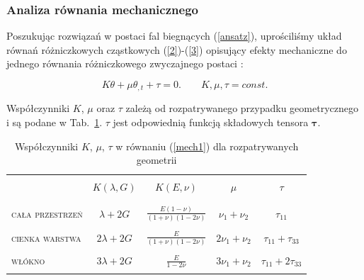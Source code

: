 \medskip 

\subsubsection{Analiza równania mechanicznego} \label{secmech} 

\medskip 

Poszukując rozwiązań w postaci fal biegnących (\ref{ansatz}), uprościliśmy układ równań różniczkowych cząstkowych (\ref{2})-(\ref{3}) opisujący efekty mechaniczne do jednego równania różniczkowego zwyczajnego postaci \cite{Kazmierczak2010,Kazmierczak2013,Kazmierczak2011}: 

\begin{equation} \label{mech1} 
K \theta + \mu \theta_{,t} + {\tau} =0. \qquad K, \mu, \tau  =const.
\end{equation}

\medskip 

\noindent Współczynniki $K$, $\mu$ oraz $\tau$ zależą od rozpatrywanego przypadku geometrycznego i są podane w Tab.~\ref{tab:tensor}. $\tau$ jest odpowiednią funkcją składowych tensora ${\boldsymbol \tau}$. 

\medskip

\begin{table}
	\centering
	\begin{tabular}{@{} | l |c | c | c | c | @{}}
		\hline 
		&&&& \\
		&$K(\lambda,G)$ & $K(E,\nu)$ &$\mu$& $\tau$ \\ 
		&&&& \\ \hline 
		&&&& \\
		\textsc{cała przestrzeń} & $\lambda+2G$ & $\frac{E(1-\nu)}{(1+\nu)(1-2\nu)}$ 
		& $\nu_1+\nu_2$ & $\tau_{11}$ \\ 
		&&&& \\
		\textsc{cienka warstwa} & $2\lambda+2G$ & $\frac{E}{(1+\nu)(1-2\nu)}$ &
		$2\nu_1+\nu_2$ & $\tau_{11}+\tau_{33}$ \\ 
		&&&& \\
		\textsc{włókno} & $3\lambda+2G$ & $\frac{E}{1-2\nu}$ & $3\nu_1 + \nu_2$ &
		$\tau_{11}+2\tau_{33}$ \\ 
		&&&& \\ 
		\hline
	\end{tabular}
	\caption[Współczynniki $K$, $\mu$ oraz $\tau$]{Współczynniki $K$, $\mu$, $\tau$ w równaniu (\ref{mech1}) dla rozpatrywanych geometrii}
	\label{tab:tensor}
\end{table}

